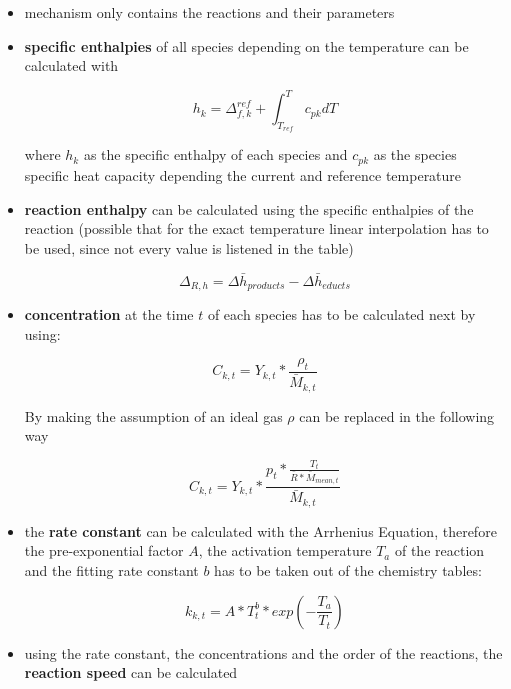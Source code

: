 \documentclass[12pt,oneside,a4paper,english]{article}
\begin{document}
\begin{itemize}
\item{mechanism only contains the reactions and their parameters}
\item{\textbf{specific enthalpies} of all species depending on the temperature can be calculated with 
	
	\begin{equation}
	h_k = \Delta_{f,k}^{ref} + \int_{T_{ref}}^T c_{pk}dT
	\end{equation}
	
where $h_k$ as the specific enthalpy of each species  and $c_{pk}$ as the species specific heat capacity depending the current and reference temperature}
	
\item{\textbf{reaction enthalpy} can be calculated using the specific enthalpies of the reaction (possible that for the exact temperature linear interpolation has to be used, since not every value is listened in the table)
	
	\begin{equation}
	\Delta_{R,h} = \Delta \bar{h}_{products} - \Delta \bar{h}_{educts} 
	\end{equation}}
	
\item{\textbf{concentration} at the time $t$ of each species has to be calculated next by using: 
	
	\begin{equation}
	C_{k,t} = Y_{k,t} * \frac{\rho_t}{\bar{M}_{k,t}}
	\end{equation}
	
By making the assumption of an ideal gas $\rho$ can be replaced in the following way
	
	\begin{equation}
	C_{k,t} = Y_{k,t} * \frac{p_t*\frac{T_t}{\bar{R}*\bar{M}_{mean,t}}}{\bar{M}_{k,t}}
	\end{equation}}
	
\item{the \textbf{rate constant} can be calculated with the Arrhenius Equation, therefore the pre-exponential factor $A$, the activation temperature $T_a$ of the reaction and the fitting rate constant $b$ has to be taken out of the chemistry tables:
	
	\begin{equation}
	k_{k,t} = A*T_t^b* exp(-\frac{T_a}{T_t})
	\end{equation}}
	
\item{using the rate constant, the concentrations and the order of the reactions, the \textbf{reaction speed} can be calculated
	
}
\end{itemize}
\end{document}
